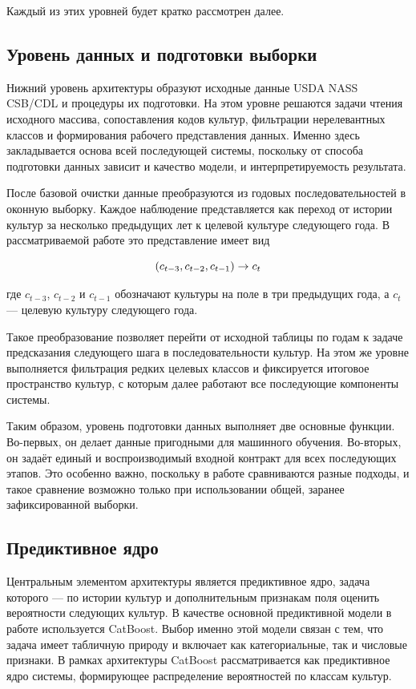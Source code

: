 Каждый из этих уровней будет кратко рассмотрен далее.

\subsection{Уровень данных и подготовки выборки}

Нижний уровень архитектуры образуют исходные данные USDA NASS CSB/CDL и процедуры их подготовки. На этом уровне решаются
задачи чтения исходного массива, сопоставления кодов культур, фильтрации нерелевантных классов и формирования рабочего
представления данных. Именно здесь закладывается основа всей последующей системы, поскольку от способа подготовки данных
зависит и качество модели, и интерпретируемость результата.

После базовой очистки данные преобразуются из годовых последовательностей в оконную выборку. Каждое наблюдение
представляется как переход от истории культур за несколько предыдущих лет к целевой культуре следующего года. В
рассматриваемой работе это представление имеет вид

\begin{equation}
\notag
(c_{t-3}, c_{t-2}, c_{t-1}) \rightarrow c_t
\end{equation}

где \(c_{t-3}\), \(c_{t-2}\) и \(c_{t-1}\) обозначают культуры на поле в три предыдущих года, а \(c_t\) --- целевую
культуру следующего года.

Такое преобразование позволяет перейти от исходной таблицы по годам к задаче предсказания следующего шага в
последовательности культур.
На этом же уровне выполняется фильтрация редких целевых классов и фиксируется итоговое пространство культур, с которым
далее работают все последующие компоненты системы.

Таким образом, уровень подготовки данных выполняет две основные функции. Во-первых, он делает данные пригодными для
машинного обучения. Во-вторых, он задаёт единый и воспроизводимый входной контракт для всех последующих этапов. Это
особенно важно, поскольку в работе сравниваются разные подходы, и такое сравнение возможно только при использовании
общей, заранее зафиксированной выборки.

\subsection{Предиктивное ядро}

Центральным элементом архитектуры является предиктивное ядро, задача которого --- по истории культур и дополнительным
признакам поля оценить вероятности следующих культур. В качестве основной предиктивной модели в работе используется
CatBoost. Выбор именно этой модели связан с тем, что задача имеет табличную природу и включает как категориальные, так
и числовые признаки. В рамках архитектуры CatBoost рассматривается как предиктивное ядро системы, формирующее
распределение вероятностей по классам культур.


